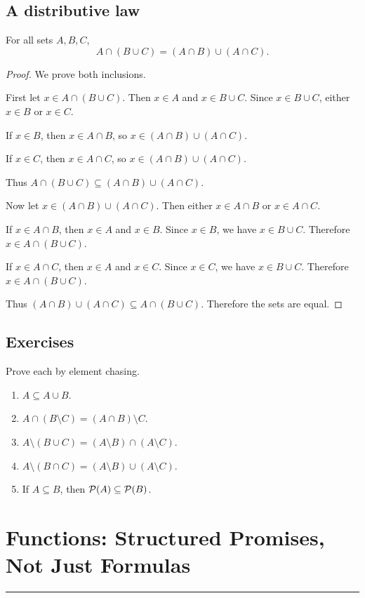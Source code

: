 \documentclass[12pt]{article}
\newcommand{\chapterline}{\vspace{0.4em}\hrule\vspace{0.8em}}
\begin{document}
\subsection{A distributive law}

\begin{theorem}
For all sets $A,B,C$,
\[
A\cap(B\cup C)=(A\cap B)\cup(A\cap C).
\]
\end{theorem}

\begin{proof}
We prove both inclusions.

First let $x\in A\cap(B\cup C)$. Then $x\in A$ and $x\in B\cup C$. Since $x\in B\cup C$, either $x\in B$ or $x\in C$.

If $x\in B$, then $x\in A\cap B$, so $x\in(A\cap B)\cup(A\cap C)$.

If $x\in C$, then $x\in A\cap C$, so $x\in(A\cap B)\cup(A\cap C)$.

Thus $A\cap(B\cup C)\subseteq(A\cap B)\cup(A\cap C)$.

Now let $x\in(A\cap B)\cup(A\cap C)$. Then either $x\in A\cap B$ or $x\in A\cap C$.

If $x\in A\cap B$, then $x\in A$ and $x\in B$. Since $x\in B$, we have $x\in B\cup C$. Therefore $x\in A\cap(B\cup C)$.

If $x\in A\cap C$, then $x\in A$ and $x\in C$. Since $x\in C$, we have $x\in B\cup C$. Therefore $x\in A\cap(B\cup C)$.

Thus $(A\cap B)\cup(A\cap C)\subseteq A\cap(B\cup C)$. Therefore the sets are equal.
\end{proof}

\subsection{Exercises}

Prove each by element chasing.

\begin{enumerate}
\item $A\subseteq A\cup B$.
\item $A\cap(B\setminus C)=(A\cap B)\setminus C$.
\item $A\setminus(B\cup C)=(A\setminus B)\cap(A\setminus C)$.
\item $A\setminus(B\cap C)=(A\setminus B)\cup(A\setminus C)$.
\item If $A\subseteq B$, then $\mathcal{P}(A)\subseteq\mathcal{P}(B)$.
\end{enumerate}

\newpage
\section{Functions: Structured Promises, Not Just Formulas}
\chapterline
\end{document}
